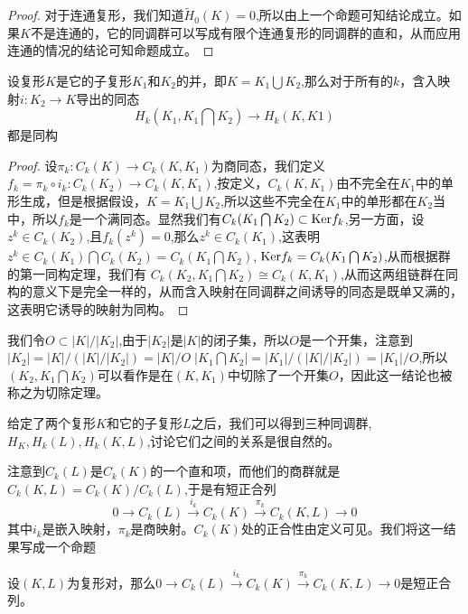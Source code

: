 \begin{proof}
对于连通复形，我们知道$\tilde{H}_{0}(K)=0$,所以由上一个命题可知结论成立。如果$K$不是连通的，它的同调群可以写成有限个连通复形的同调群的直和，从而应用连通的情况的结论可知命题成立。
\end{proof}
\begin{proposition}\label{chap3_pro_90}
设复形$K$是它的子复形$K_{1}$和$K_{2}$的并，即$K=K_{1}\bigcup K_{2}$,那么对于所有的$k$，含入映射$i:K_{2}\rightarrow K$导出的同态$$H_{k}(K_{1},K_{1}\bigcap K_{2})\rightarrow H_{k}(K,K{1})$$都是同构
\end{proposition}
\begin{proof}
设$\pi_{k}:C_{k}(K)\rightarrow C_{k}(K,K_{1})$为商同态，我们定义$f_{k}=\pi_{k}\circ i_{k}:C_{k}(K_{2})\rightarrow C_{k}(K,K_{1})$,按定义，$C_{k}(K,K_{1})$由不完全在$K_{1}$中的单形生成，但是根据假设，$K=K_{1}\bigcup K_{2}$,所以这些不完全在$K_{1}$中的单形都在$K_{2}$当中，所以$f_{k}$是一个满同态。显然我们有$C_{k}(K_{1}\bigcap K_{2})\subset {\rm Ker} f_{k}$,另一方面，设$z^{k}\in C_{k}(K_{2})$,且$f_{k}(z^{k})=0$,那么$z^{k}\in C_{k}(K_{1})$,这表明$z^{k}\in C_{k}(K_{1})\bigcap C_{k}(K_{2})=C_{k}(K_{1}\bigcap K_{2})$,$\;{\rm Ker} f_{k}=C_{k}(K_{1}\bigcap K_{2})$,从而根据群的第一同构定理，我们有
$C_{k}(K_{2},K_{1}\bigcap K_{2})\cong C_{k}(K,K_{1})$,从而这两组链群在同构的意义下是完全一样的，从而含入映射在同调群之间诱导的同态是既单又满的，这表明它诱导的映射为同构。
\end{proof}
\begin{remark}
我们令$O\subset |K|/|K_{2}|$,由于$|K_{2}|$是$|K|$的闭子集，所以$O$是一个开集，注意到$|K_{2}|=|K|/(|K|/|K_{2}|)=|K|/O\;|K_{1}\bigcap K_{2}|=|K_{1}|/(|K|/|K_{2}|)=|K_{1}|/O$,所以$(K_{2},K_{1}\bigcap K_{2})$可以看作是在$(K,K_{1})$中切除了一个开集$O$，因此这一结论也被称之为切除定理。
\end{remark}

给定了两个复形$K$和它的子复形$L$之后，我们可以得到三种同调群,$H_{K},H_{k}(L),H_{k}(K,L)$,讨论它们之间的关系是很自然的。

注意到$C_{k}(L)$是$C_{k}(K)$的一个直和项，而他们的商群就是$C_{k}(K,L)=C_{k}(K)/C_{k}(L)$,于是有短正合列
$$0\rightarrow C_{k}(L)\xrightarrow{i_{k}}C_{k}(K)\xrightarrow{\pi_{k}}C_{k}(K,L)\rightarrow 0$$
其中$i_{k}$是嵌入映射，$\pi_{k}$是商映射。$C_{k}(K)$处的正合性由定义可见。我们将这一结果写成一个命题
\begin{proposition}\label{chap3_pro_106}
设$(K,L)$为复形对，那么$0\rightarrow C_{k}(L)\xrightarrow{i_{k}}C_{k}(K)\xrightarrow{\pi_{k}}C_{k}(K,L)\rightarrow 0$是短正合列。
\end{proposition}

